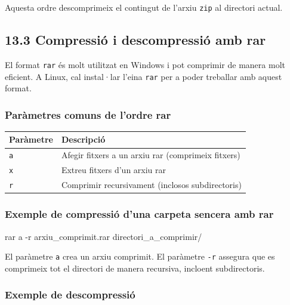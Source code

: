 \documentclass[
  12 pt,
  a4paper,
]{article}
\newenvironment{Shaded}{\begin{snugshade}}{\end{snugshade}}
\newcommand{\AttributeTok}[1]{\textcolor[rgb]{0.13,0.29,0.53}{#1}}
\newcommand{\ExtensionTok}[1]{#1}
\newcommand{\NormalTok}[1]{#1}
\begin{document}
Aquesta ordre descomprimeix el contingut de l'arxiu \texttt{zip} al
directori actual.

\subsection{13.3 Compressió i descompressió amb
rar}\label{compressiuxf3-i-descompressiuxf3-amb-rar}

El format \texttt{rar} és molt utilitzat en Windows i pot comprimir de
manera molt eficient. A Linux, cal instal·lar l'eina \texttt{rar} per a
poder treballar amb aquest format.

\subsubsection{Paràmetres comuns de l'ordre
rar}\label{paruxe0metres-comuns-de-lordre-rar}

\begin{longtable}[]{@{}ll@{}}
\toprule\noalign{}
Paràmetre & Descripció \\
\midrule\noalign{}
\endhead
\bottomrule\noalign{}
\endlastfoot
\texttt{a} & Afegir fitxers a un arxiu rar (comprimeix fitxers) \\
\texttt{x} & Extreu fitxers d'un arxiu rar \\
\texttt{r} & Comprimir recursivament (inclosos subdirectoris) \\
\end{longtable}

\subsubsection{Exemple de compressió d'una carpeta sencera amb
rar}\label{exemple-de-compressiuxf3-duna-carpeta-sencera-amb-rar}

\begin{Shaded}
\begin{Highlighting}[]
\ExtensionTok{rar}\NormalTok{ a }\AttributeTok{{-}r}\NormalTok{ arxiu\_comprimit.rar directori\_a\_comprimir/}
\end{Highlighting}
\end{Shaded}

El paràmetre \texttt{a} crea un arxiu comprimit. El paràmetre
\texttt{-r} assegura que es comprimeix tot el directori de manera
recursiva, incloent subdirectoris.

\subsubsection{Exemple de
descompressió}\label{exemple-de-descompressiuxf3}
\end{document}
